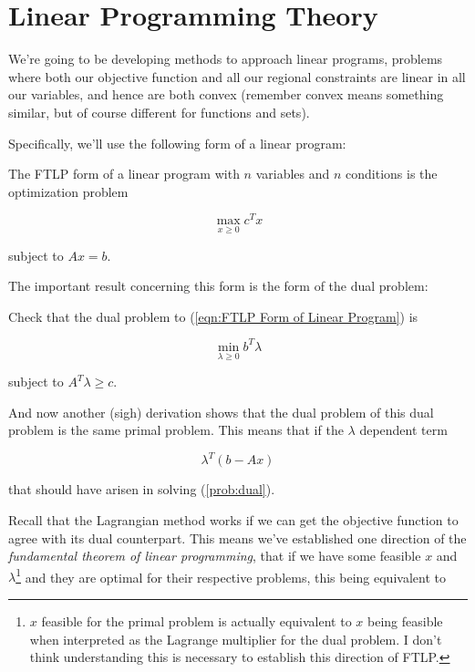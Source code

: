 \documentclass[11pt]{scrartcl}
\begin{document}
\section{Linear Programming Theory}

We're going to be developing methods to approach linear programs, problems where both our objective function and all our regional constraints are linear in all our variables, and hence are both convex (remember convex means something similar, but of course different for functions and sets). 

Specifically, we'll use the following form of a linear program:

\begin{definition}

The FTLP form of a linear program with $n$ variables and $n$ conditions is the optimization problem

\begin{equation}
    \max_{x \ge 0} c^T x
\label{eqn:FTLP Form of Linear Program}
\end{equation}

subject to $Ax = b$.
\end{definition}

The important result concerning this form is the form of the dual problem:

\begin{problem}
    Check that the dual problem to (\ref{eqn:FTLP Form of Linear Program}) is
    
    \begin{equation}
        \min_{\lambda \ge 0} b^T \lambda
    \label{eqn:Dual of Standard}
    \end{equation}
    
    subject to $A^T \lambda \ge c$.
\label{prob:dual}
\end{problem}

And now another (sigh) derivation shows that the dual problem of this dual problem is the same primal problem. This means that if the $\lambda$ dependent term

\begin{equation}
    \lambda^T(b-Ax)
\label{eqn:Comp slackness}
\end{equation}

that should have arisen in solving (\ref{prob:dual}).

Recall that the Lagrangian method works if we can get the objective function to agree with its dual counterpart. This means we've established one direction of the \emph{fundamental theorem of linear programming}, that if we have some feasible $x$ and $\lambda$\footnote{$x$ feasible for the primal problem is actually equivalent to $x$ being feasible when interpreted as the Lagrange multiplier for the dual problem. I don't think understanding this is necessary to establish this direction of FTLP.} and they are optimal for their respective problems, this being equivalent to 
\end{document}
